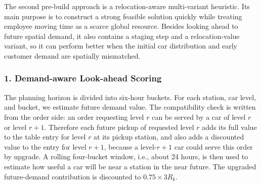 \documentclass[10pt,a4paper]{article}
\begin{document}
The second pre-build approach is a relocation-aware multi-variant heuristic.  Its
main purpose is to construct a strong feasible solution quickly while treating
employee moving time as a scarce global resource.  Besides looking ahead to
future spatial demand, it also contains a staging step and a relocation-value
variant, so it can perform better when the initial car distribution and early
customer demand are spatially mismatched.

\subsubsection*{1. Demand-aware Look-ahead Scoring}

The planning horizon is divided into six-hour buckets.  For each station, car
level, and bucket, we estimate future demand value.  The compatibility check is
written from the order side: an order requesting level $r$ can be served by a
car of level $r$ or level $r+1$.  Therefore each future pickup of requested
level $r$ adds its full value to the table entry for level $r$ at its pickup
station, and also adds a discounted value to the entry for level $r+1$, because
a level-$r+1$ car could serve this order by upgrade.  A rolling four-bucket
window, i.e., about 24 hours, is then used to estimate how useful a car will be
near a station in the near future.  The upgraded future-demand contribution is
discounted to $0.75\times 3R_k$.
\end{document}
